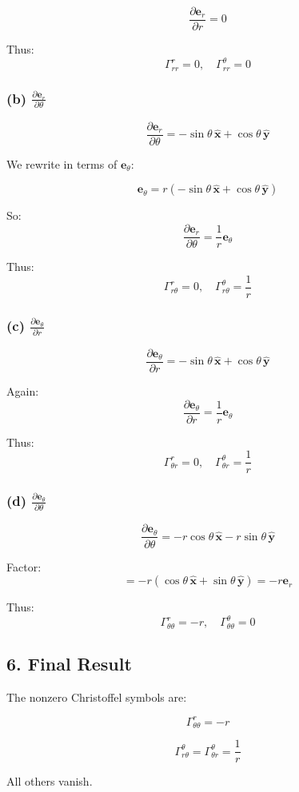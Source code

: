 \documentclass{article}
\begin{document}
	\[
	\frac{\partial \mathbf{e}_r}{\partial r} = 0
	\]
	
	Thus:
	\[
	\Gamma^r_{rr} = 0, \quad \Gamma^\theta_{rr} = 0
	\]
	
	\subsubsection*{(b) $\frac{\partial \mathbf{e}_r}{\partial \theta}$}
	
	\[
	\frac{\partial \mathbf{e}_r}{\partial \theta}
	= -\sin\theta \, \hat{\mathbf{x}} + \cos\theta \, \hat{\mathbf{y}}
	\]
	
	We rewrite in terms of $\mathbf{e}_\theta$:
	
	\[
	\mathbf{e}_\theta = r(-\sin\theta \, \hat{\mathbf{x}} + \cos\theta \, \hat{\mathbf{y}})
	\]
	
	So:
	\[
	\frac{\partial \mathbf{e}_r}{\partial \theta}
	= \frac{1}{r} \mathbf{e}_\theta
	\]
	
	Thus:
	\[
	\Gamma^r_{r\theta} = 0, \quad \Gamma^\theta_{r\theta} = \frac{1}{r}
	\]
	
	\subsubsection*{(c) $\frac{\partial \mathbf{e}_\theta}{\partial r}$}
	
	\[
	\frac{\partial \mathbf{e}_\theta}{\partial r}
	= -\sin\theta \, \hat{\mathbf{x}} + \cos\theta \, \hat{\mathbf{y}}
	\]
	
	Again:
	\[
	\frac{\partial \mathbf{e}_\theta}{\partial r}
	= \frac{1}{r} \mathbf{e}_\theta
	\]
	
	Thus:
	\[
	\Gamma^r_{\theta r} = 0, \quad \Gamma^\theta_{\theta r} = \frac{1}{r}
	\]
	
	\subsubsection*{(d) $\frac{\partial \mathbf{e}_\theta}{\partial \theta}$}
	
	\[
	\frac{\partial \mathbf{e}_\theta}{\partial \theta}
	=
	-r\cos\theta \, \hat{\mathbf{x}} - r\sin\theta \, \hat{\mathbf{y}}
	\]
	
	Factor:
	\[
	= -r(\cos\theta \, \hat{\mathbf{x}} + \sin\theta \, \hat{\mathbf{y}})
	= -r \mathbf{e}_r
	\]
	
	Thus:
	\[
	\Gamma^r_{\theta\theta} = -r, \quad \Gamma^\theta_{\theta\theta} = 0
	\]
	
	\subsection*{6. Final Result}
	
	The nonzero Christoffel symbols are:
	
	\[
	\Gamma^r_{\theta\theta} = -r
	\]
	
	\[
	\Gamma^\theta_{r\theta} = \Gamma^\theta_{\theta r} = \frac{1}{r}
	\]
	
	All others vanish.
	
\end{document}
